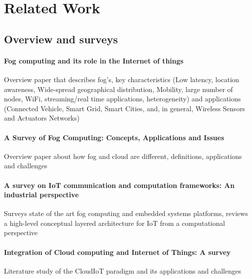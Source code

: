 \section{Related Work}



\subsection{Overview and surveys}

\paragraph{Fog computing and its role in the Internet of things} \cite{Bonomi:2012:FCR:2342509.2342513}
Overview paper that describes fog's, key characteristics (Low latency, location awareness, Wide-spread geographical distribution, Mobility, large number of nodes, WiFi, streaming/real time applications, heterogeneity) and applications (Connected Vehicle, Smart Grid, Smart Cities, and, in general, Wireless Sensors and Actuators Networks)

\paragraph{A Survey of Fog Computing: Concepts, Applications and Issues} \cite{Yi:2015:SFC:2757384.2757397}
Overview paper about how fog and cloud are different, definitions, applications and challenges

\paragraph{A survey on IoT communication and computation frameworks: An industrial perspective}\cite{7868354}
Surveys state of the art fog computing and embedded systems platforms, reviews a high-level conceptual layered architecture for IoT from a computational perspective

\paragraph{Integration of Cloud computing and Internet of Things: A survey}\cite{botta_integration_2016}
Literature study of the CloudIoT paradigm and its applications and challenges

